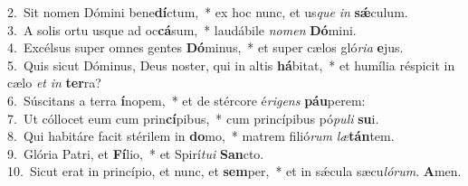 {2.~}Sit nomen Dómini bene\textbf{dí}ctum,~* ex hoc nunc, et us\textit{que} \textit{in} \textbf{sǽ}culum.\\
{3.~}A solis ortu usque ad oc\textbf{cá}sum,~* laudábile \textit{no}\textit{men} \textbf{Dó}mini.\\
{4.~}Excélsus super omnes gentes \textbf{Dó}minus,~* et super cælos gló\textit{ri}\textit{a} \textbf{e}jus.\\
{5.~}Quis sicut Dóminus, Deus noster, qui in altis \textbf{há}bitat,~* et humília réspicit in cælo \textit{et} \textit{in} \textbf{ter}ra?\\
{6.~}Súscitans a terra \textbf{í}nopem,~* et de stércore é\textit{ri}\textit{gens} \textbf{páu}perem:\\
{7.~}Ut cóllocet eum cum prin\textbf{cí}pibus,~* cum princípibus pó\textit{pu}\textit{li} \textbf{su}i.\\
{8.~}Qui habitáre facit stérilem in \textbf{do}mo,~* matrem filió\textit{rum} \textit{læ}\textbf{tán}tem.\\
{9.~}Glória Patri, et \textbf{Fí}lio,~* et Spirí\textit{tu}\textit{i} \textbf{San}cto.\\
{10.~}Sicut erat in princípio, et nunc, et \textbf{sem}per,~* et in sǽcula sæcu\textit{ló}\textit{rum}. \textbf{A}men.\\
